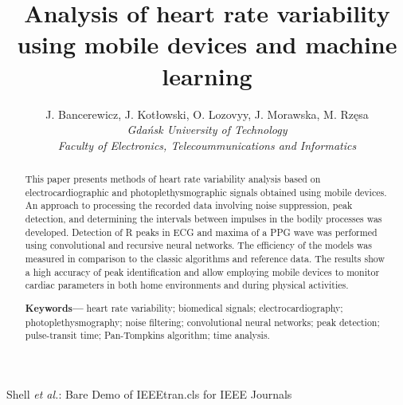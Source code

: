 \documentclass[journal]{IEEEtran}
\begin{document}
\title{Analysis of heart rate variability using mobile devices and machine learning}
\author{
    J. Bancerewicz, J. Kotłowski, O. Lozovyy, J. Morawska, M. Rzęsa\\
    \textit{Gdańsk University of Technology}\\
    \textit{Faculty of Electronics, Telecoummunications and Informatics}
}


\markboth{}%
{Shell \MakeLowercase{\textit{et al.}}: Bare Demo of IEEEtran.cls for IEEE Journals}
\maketitle

\begin{abstract}
This paper presents methods of heart rate variability analysis based on electrocardiographic and photoplethysmographic signals obtained using mobile devices. An approach to processing the recorded data involving noise suppression, peak detection, and determining the intervals between impulses in the bodily processes was developed. Detection of R peaks in ECG and maxima of a PPG wave was performed using convolutional and recursive neural networks. The efficiency of the models was measured in comparison to the classic algorithms and reference data. The results show a high accuracy of peak identification and allow employing mobile devices to monitor cardiac parameters in both home environments and during physical activities.


\textbf{Keywords---} heart rate variability; biomedical signals; electrocardiography; photoplethysmography; noise filtering; convolutional neural networks; peak detection; pulse-transit time; Pan-Tompkins algorithm; time analysis.
\end{abstract}
\end{document}
